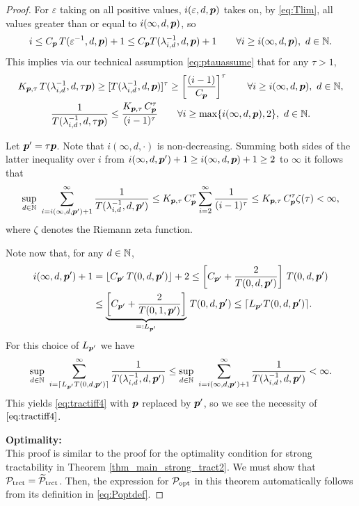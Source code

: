 \documentclass[sort&compress]{elsarticle}
\begin{document}
\begin{proof}
For $\varepsilon$ taking on all positive values, $i(\varepsilon,d,\boldsymbol{p})$ takes on, by \eqref{eq:Tlim}, all values greater than or equal to $i(\infty,d,\boldsymbol{p})$, so
\[
i\le C_{\boldsymbol{p}}\, T(\varepsilon^{-1},d,\boldsymbol{p})+1 \le C_{\boldsymbol{p}} T(\lambda_{i,d}^{-1},d,\boldsymbol{p})+1 \qquad \forall i \ge i(\infty,d,\boldsymbol{p}),  \ d \in \mathbb{N}.
\]
This implies via our technical assumption \eqref{eq:ptauassume} that for any $\tau > 1$,
\begin{gather*}
	K_{\boldsymbol{p},\tau}\,T (\lambda_{i,d}^{-1},d,\tau \boldsymbol{p}) \ge
	[T(\lambda_{i,d}^{-1},d, \boldsymbol{p})]^\tau
	\ge
	\left[\frac{(i-1)}{C_{\boldsymbol{p}}}\right]^\tau \qquad \forall i \ge i(\infty,d,\boldsymbol{p}),  \ d \in \mathbb{N}, \\
	 \frac{1}{T (\lambda_{i,d}^{-1},d,\tau \boldsymbol{p})} \le
	\frac{K_{\boldsymbol{p},\tau}\, C_{\boldsymbol{p}}^\tau}{(i-1)^\tau}\qquad \forall i \ge \max\{i(\infty,d,\boldsymbol{p}),2\},  \ d \in \mathbb{N}.
\end{gather*}

Let $\boldsymbol{p}' = \tau \boldsymbol{p}$.  Note that $i(\infty,d,\cdot)$ is non-decreasing.  Summing both sides of the latter inequality over $i$ from $i(\infty,d,\boldsymbol{p}') + 1 \ge i(\infty,d, \boldsymbol{p}) + 1 \ge 2$ to $\infty$ it follows that
\begin{equation*}
	\sup_{d\in\mathbb{N}} \, \, \sum_{i=i (\infty,d,\boldsymbol{p}')+1}^\infty \frac{1}{T (\lambda_{i,d}^{-1},d,\boldsymbol{p}')}
	 \le  K_{\boldsymbol{p},\tau}\, C_{\boldsymbol{p}}^\tau
	\sum_{i=2}^\infty \frac{1}{(i-1)^\tau} \\
	 \le  K_{\boldsymbol{p},\tau}\, C_{\boldsymbol{p}}^\tau
	\zeta (\tau)  < \infty,
\end{equation*}
where $\zeta$ denotes the Riemann zeta function.


Note now that, for any $d\in\mathbb{N}$,
\begin{align*}
 i(\infty,d,\boldsymbol{p}') +1  & = \lfloor C_{\boldsymbol{p}'}\, T(0,d,\boldsymbol{p}')\rfloor +2 \le  \left[C_{\boldsymbol{p}'} + \frac{2}{T(0,d,\boldsymbol{p}')}   \right]\, T(0,d,\boldsymbol{p}')\\
 & \le  \underbrace{\left[C_{\boldsymbol{p}'} + \frac{2}{T(0,1,\boldsymbol{p}')}   \right]}_{=:L_{\boldsymbol{p}'}}\, T(0,d,\boldsymbol{p}')
 \le \lceil L_{\boldsymbol{p}'} T(0,d,\boldsymbol{p}')\rceil .
\end{align*}
For this choice of $L_{\boldsymbol{p}'}$ we have
\[
\sup_{d\in\mathbb{N}}\,\, \sum_{i=\lceil L_{\boldsymbol{p}'}T(0,d,\boldsymbol{p}')\rceil}^\infty \frac{1}{T(\lambda_{i,d}^{-1},d, \boldsymbol{p}')}
\le
\sup_{d\in\mathbb{N}} \, \, \sum_{i=i (\infty,d,\boldsymbol{p}')+1}^\infty \frac{1}{T (\lambda_{i,d}^{-1},d,\boldsymbol{p}')} <
\infty.
\]
This yields \eqref{eq:tractiff4} with $\boldsymbol{p}$ replaced by $\boldsymbol{p}'$, so we see the necessity of $\eqref{eq:tractiff4}$.

\bigskip

\noindent \textbf{Optimality:} \\
This proof is similar to the proof for the optimality condition for strong tractability in Theorem \ref{thm_main_strong_tract2}. We must show that $\mathcal{P}_{\textup{trct}} = \widetilde{\mathcal{P}}_{\textup{trct}}$.  Then, the expression for  $\mathcal{P}_{\textup{opt}}$ in this theorem automatically follows from its definition in \eqref{eq:Poptdef}.


\end{proof}
\end{document}
